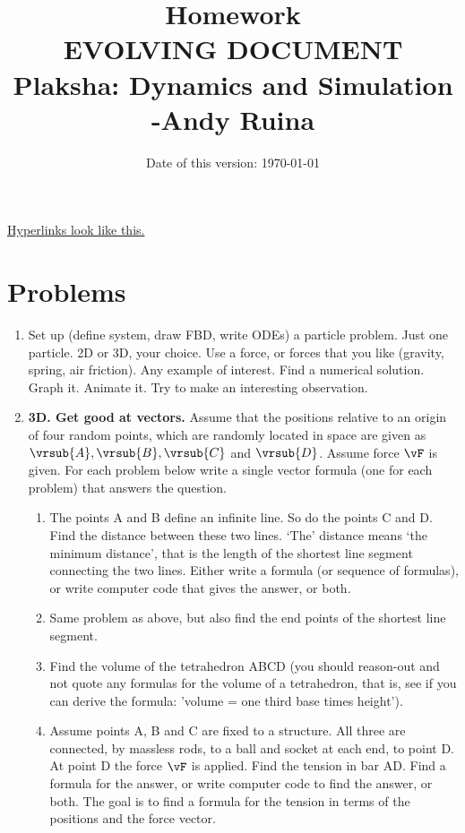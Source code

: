 \documentclass[11pt]{article}
\title{\vskip -1in \textbf{Homework}\\
EVOLVING DOCUMENT\\
Plaksha:  Dynamics and Simulation\\ \medskip
\normalsize -Andy Ruina
 }
\date{Date of this version:  \today}
\begin{document}
\maketitle

\noindent
\href{http://en.wikipedia.org/wiki/Hyperlink}{\color{blue}Hyperlinks look like this.}
 




\section{Problems}




\begin{enumerate} %

\item \textbf{} Set up  (define system, draw FBD, write ODEs) a particle problem. Just one particle.
2D or 3D, your choice.
Use a force, or forces that you like (gravity, spring,  air friction). Any example of interest.
Find a numerical solution. Graph it. Animate it.
Try to make an interesting observation.

\par


\item \textbf{3D. Get good at vectors.} Assume that the positions relative to an origin of four random points,  which are randomly located in space are given as $\vrsub{A}, \vrsub{B},\vrsub{C}$ and $\vrsub{D}$. Assume force $\vF$ is given.  For each problem below write a single vector formula (one for each problem) that answers the question. 

\begin{enumerate}[\bf a)]
\item  The points A and B define an infinite line.  So do the points C and D.  Find the distance between these two lines. `The' distance means `the minimum distance', that is the length of the shortest line segment connecting the two lines.  Either write a formula (or sequence of formulas), or write computer code that gives the answer, or both.
\item Same problem as above, but also find the end points of the shortest line segment.
\item Find the volume of the tetrahedron ABCD (you should reason-out and not quote any
formulas for the volume of a tetrahedron, that is, see if you can derive the formula: 'volume = one third base times height').
\item Assume points A, B and C are fixed to a structure.  All three are connected, by massless
rods, to a ball and socket at each end, to point D.  At point D the force $\vF$ is applied.  Find
the tension in bar AD.  Find a formula for the answer, or write computer code to find the answer, or both. The goal is to find a formula for the tension in terms of the positions and the force vector. 


\end{enumerate}
\end{enumerate}
\end{document}
